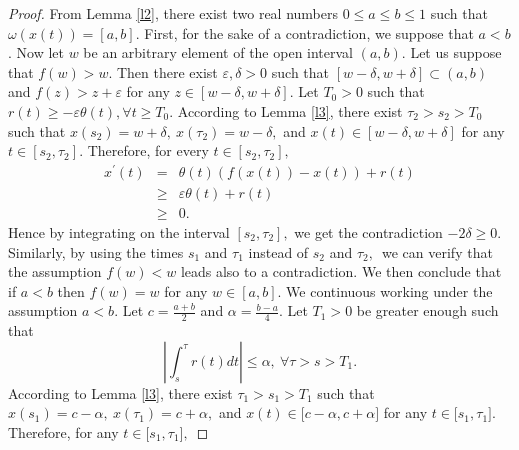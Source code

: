 \documentclass[11pt]{amsart}%
\theoremstyle{plain}
\numberwithin{equation}{section}
\begin{document}
\begin{proof}
From Lemma \ref{l2}, there exist two real numbers $0\leq a\leq b\leq 1$ such that $\omega
(x(t))=[a,b].$ First, for the sake of a contradiction, we suppose that $a<b$.  Now let $w$ be an arbitrary element of the open interval $(a,b).$ Let us
suppose that $f(w)>w.$ Then there exist $\varepsilon ,\delta >0$ such that $%
[w-\delta ,w+\delta ]\subset (a,b)$ and $f(z)>z+\varepsilon $ for any $z\in [w-\delta ,w+\delta ].$ Let $T_{0}>0$ such that $r(t)\geq
-\varepsilon \theta (t),\forall t\geq T_{0}.$ According to Lemma \ref{l3}, there
exist $\tau _{2}>s_{2}>T_{0}$ such that $x(s_{2})=w+\delta ,~x(\tau
_{2})=w-\delta ,$ and $x(t)\in [w-\delta ,w+\delta ]$ for any $t\in
[s_{2},\tau _{2}].$ Therefore, for every $t\in [s_{2},\tau
_{2}],$%
\begin{eqnarray*}
x^{\prime }(t) &=&\theta (t)(f(x(t))-x(t))+r(t) \\
&\geq &\varepsilon \theta (t)+r(t) \\
&\geq &0.
\end{eqnarray*}%
Hence by integrating on the interval $[s_{2},\tau _{2}],$ we get the
contradiction $-2\delta \geq 0.$ Similarly, by using the times $s_{1}$ and $%
\tau _{1}$ instead of $s_{2}$ and $\tau _{2},$\ we can verify that the
assumption $f(w)<w$ leads also to a contradiction. We then conclude that if $%
a<b$ then $f(w)=w$ for any $w\in [a,b].$ We continuous working under
the assumption $a<b.$ Let $c=\frac{a+b}{2}$ and $\alpha =\frac{b-a}{4}.$ Let
$T_{1}>0$ be greater enough such that
\begin{equation}
\left\vert \int_{s}^{\tau }r(t)dt\right\vert \leq \alpha ,~\forall \tau
>s>T_{1}.  \label{h5}
\end{equation}%
According to Lemma \ref{l3}, there exist $\tau _{1}>s_{1}>T_{1}$ such that $%
x(s_{1})=c-\alpha ,~x(\tau _{1})=c+\alpha ,$ and $x(t)\in \lbrack c-\alpha
,c+\alpha ]$ for any $t\in \lbrack s_{1},\tau _{1}].$ Therefore, for any $%
t\in \lbrack s_{1},\tau _{1}],$


\end{proof}
\end{document}
